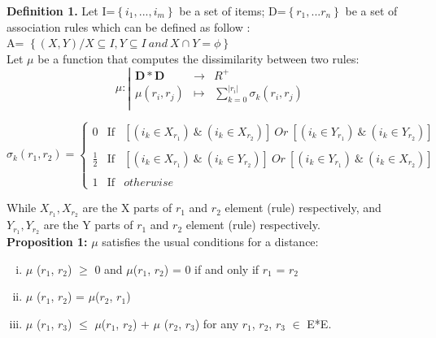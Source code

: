\documentclass[preprint,12pt]{elsarticle}
\begin{document}
\textbf{Definition 1.}
Let I=$\left\{i_{1},...,i_{m}\right\}$ be a set of items; D=$\left\{r_{1},...r_{n}\right\}$ be a set of association rules which can be defined as follow :  \\
A= $\left\{ (X,Y) / X  \subseteq  I, Y   \subseteq  I ~and~ X  \cap  Y =  \phi   \right\}$ \\
Let $\mu$ be a function that computes the dissimilarity between two rules:
\begin{displaymath}
\mu :
\left|
  \begin{array}{rcl}
    \mathbf{D*D} & \longrightarrow & {R^{+}} \\
    \mu (r_{i},r_{j}) & \longmapsto & \sum_{k=0}^{\left|r_i\right|}{\sigma_{k}{(r_{i},r_{j})}} \\
  \end{array}
\right.
\end{displaymath}

\begin{displaymath}
\sigma_{k}{(r_1,r_2)} =
\left\lbrace
\begin{array}{ccc}
0           & \mbox{If} &  [(i_{k} \in X_{r_1} )~\&~(i_{k} \in X_{r_2})]~Or~[(i_{k} \in Y_{r_1} ) ~\&~(i_{k} \in Y_{r_2})]  \\ \\
\frac{1}{2} & \mbox{If} &  [(i_{k} \in X_{r_1} )~\&~(i_{k} \in Y_{r_2})]~Or~[(i_{k} \in Y_{r_1} )~\&~(i_{k} \in X_{r_2})]\\\\
1           & \mbox{If} & otherwise
\end{array}\right.
\end{displaymath}

While $X_{r_1}, X_{r_2}$ are the X parts of $r_1$ and $r_2$ element (rule)
respectively, and $Y_{r_1}, Y_{r_2}$ are the Y parts of $r_1$ and $r_2$
element (rule) respectively. \\

\textbf{Proposition 1:} 
$\mu$   satisfies the usual conditions for a distance:
\begin{enumerate}[i)]
\item  $\mu$ ($r_1$, $r_2$) $\geq$ 0 and $\mu$($r_1$, $r_2$) = 0 if and only if $r_1$ = $r_2$
\item  $\mu$ ($r_1$, $r_2$) = $\mu$($r_2$, $r_1$)
\item  $\mu$ ($r_1$, $r_3$) $\leq$ $\mu$($r_1$, $r_2$) + $\mu$ ($r_2$, $r_3$) for any $r_1$, $r_2$, $r_3$ $\in$ E*E.
\end{enumerate}
\end{document}
